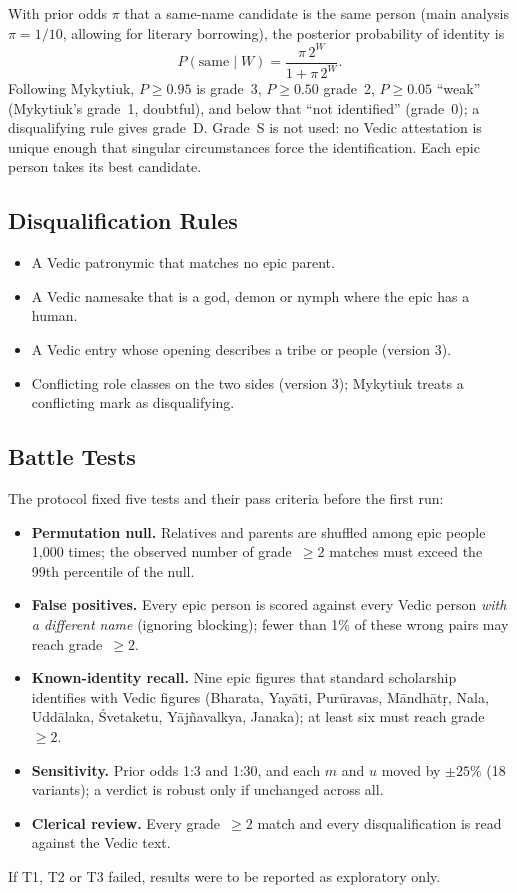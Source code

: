 \documentclass[journal]{IEEEtran}
\begin{document}
With prior odds $\pi$ that a same-name candidate is the same person (main analysis $\pi=1/10$, allowing for
literary borrowing), the posterior probability of identity is
\begin{equation}
P(\text{same}\mid W)=\frac{\pi\,2^{W}}{1+\pi\,2^{W}}.
\end{equation}
Following Mykytiuk, $P\ge0.95$ is grade~3, $P\ge0.50$ grade~2, $P\ge0.05$ ``weak'' (Mykytiuk's grade~1, doubtful),
and below that ``not identified'' (grade~0); a disqualifying rule gives grade~D. Grade~S is not used: no Vedic attestation
is unique enough that singular circumstances force the identification.
Each epic person takes its best candidate.

\subsection{Disqualification Rules}
\begin{itemize}
\item[R2] A Vedic patronymic that matches no epic parent.
\item[R3] A Vedic namesake that is a god, demon or nymph where the epic has a human.
\item[R6] A Vedic entry whose opening describes a tribe or people (version 3).
\item[R7] Conflicting role classes on the two sides (version 3); Mykytiuk treats a conflicting mark as disqualifying.
\end{itemize}

\subsection{Battle Tests}
The protocol fixed five tests and their pass criteria before the first run:
\begin{itemize}
\item[T1] \textbf{Permutation null.} Relatives and parents are shuffled among epic people 1,000 times; the observed
number of grade~$\ge2$ matches must exceed the 99th percentile of the null.
\item[T2] \textbf{False positives.} Every epic person is scored against every Vedic person \emph{with a different name}
(ignoring blocking); fewer than 1\% of these wrong pairs may reach grade~$\ge2$.
\item[T3] \textbf{Known-identity recall.} Nine epic figures that standard scholarship identifies with Vedic figures
(Bharata, Yayāti, Purūravas, Māndhātṛ, Nala, Uddālaka, Śvetaketu, Yājñavalkya, Janaka); at least six must reach grade~$\ge2$.
\item[T4] \textbf{Sensitivity.} Prior odds 1:3 and 1:30, and each $m$ and $u$ moved by $\pm25\%$ (18 variants); a verdict is
robust only if unchanged across all.
\item[T5] \textbf{Clerical review.} Every grade~$\ge2$ match and every disqualification is read against the Vedic text.
\end{itemize}
If T1, T2 or T3 failed, results were to be reported as exploratory only.
\end{document}
